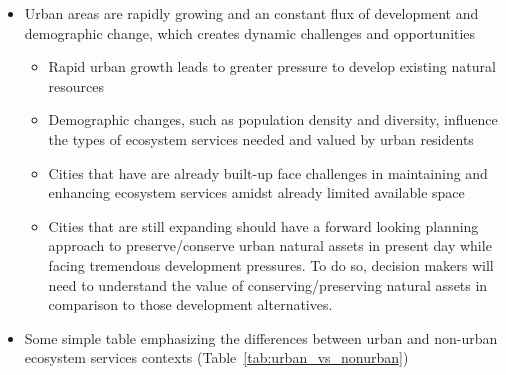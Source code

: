 \documentclass[12pt]{article}
\begin{document}
\begin{itemize}
  \textbf{Andie: Originally we wanted below to sit under this second section, but it seems like maybe the Section \ref{sec:intro} could be combined with Section \ref{sec:background}}

  \item Urban areas are rapidly growing and an constant flux of development and demographic change, which creates dynamic challenges and opportunities 
  \begin{itemize}
    \item Rapid urban growth leads to greater pressure to develop existing natural resources
    \item Demographic changes, such as population density and diversity, influence the types of ecosystem services needed and valued by urban residents
    \item Cities that have are already built-up face challenges in maintaining and enhancing ecosystem services amidst already limited available space 
    \item Cities that are still expanding should have a forward looking planning approach to preserve/conserve urban natural assets in present day while facing tremendous development pressures. To do so, decision makers will need to understand the value of conserving/preserving natural assets in comparison to those development alternatives.
  \end{itemize}
  \item Some simple table emphasizing the differences between urban and non-urban ecosystem services contexts (Table~\ref{tab:urban_vs_nonurban}) 
  

\end{itemize}
\end{document}
